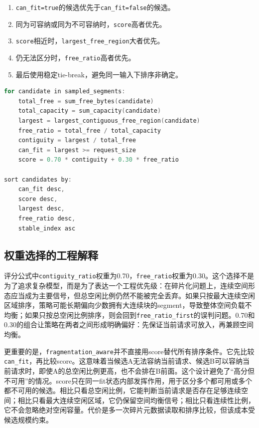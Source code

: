 \documentclass[UTF8,zihao=-4,a4paper]{ctexart}
\newcommand{\artifact}[1]{\texttt{#1}}
\newcommand{\strategy}{\texttt{fragmentation\_aware}}
\newcommand{\baseline}{\texttt{free\_ratio\_first}}
\begin{document}
\begin{enumerate}
  \item \artifact{can\_fit=true}的候选优先于\artifact{can\_fit=false}的候选。
  \item 同为可容纳或同为不可容纳时，\artifact{score}高者优先。
  \item \artifact{score}相近时，\artifact{largest\_free\_region}大者优先。
  \item 仍无法区分时，\artifact{free\_ratio}高者优先。
  \item 最后使用稳定tie-break，避免同一输入下排序非确定。
\end{enumerate}

\begin{lstlisting}[language=C++,caption={\strategy{}候选排序伪代码}]
for candidate in sampled_segments:
    total_free = sum_free_bytes(candidate)
    total_capacity = sum_capacity(candidate)
    largest = largest_contiguous_free_region(candidate)
    free_ratio = total_free / total_capacity
    contiguity = largest / total_free
    can_fit = largest >= request_size
    score = 0.70 * contiguity + 0.30 * free_ratio

sort candidates by:
    can_fit desc,
    score desc,
    largest desc,
    free_ratio desc,
    stable_index asc
\end{lstlisting}

\subsection{权重选择的工程解释}

评分公式中\artifact{contiguity\_ratio}权重为0.70，\artifact{free\_ratio}权重为0.30。这个选择不是为了追求复杂模型，而是为了表达一个工程优先级：在碎片化问题上，连续空间形态应当成为主要信号，但总空闲比例仍然不能被完全丢弃。如果只按最大连续空闲区域排序，策略可能长期偏向少数拥有大连续块的segment，导致整体空间负载不均衡；如果只按总空闲比例排序，则会回到\baseline{}的误判问题。0.70和0.30的组合让策略在两者之间形成明确偏好：先保证当前请求可放入，再兼顾空间均衡。

更重要的是，\strategy{}并不直接用score替代所有排序条件。它先比较\artifact{can\_fit}，再比较score。这意味着当候选A无法容纳当前请求、候选B可以容纳当前请求时，即使A的总空闲比例更高，也不会排在B前面。这个设计避免了“高分但不可用”的情况。score只在同一fit状态内部发挥作用，用于区分多个都可用或多个都不可用的候选。相比只看总空闲比例，它能判断当前请求是否存在足够连续空间；相比只看最大连续空闲区域，它仍保留空间均衡信号；相比只看连续性比例，它不会忽略绝对空闲容量。代价是多一次碎片元数据读取和排序比较，但该成本受候选规模约束。
\end{document}
